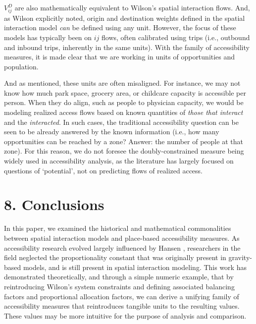\documentclass[
  10pt,
  letterpaper,
]{article}
\begin{document}
\(V_{ij}^D\) are also mathematically equivalent to Wilson's spatial
interaction flows. And, as Wilson \citep{wilson1971} explicitly noted,
origin and destination weights defined in the spatial interaction model
\emph{can} be defined using any unit. However, the focus of these models
has typically been on \(ij\) flows, often calibrated using trips (i.e.,
outbound and inbound trips, inherently in the same units). With the
family of accessibility measures, it is made clear that we are working
in units of opportunities and population.

And as mentioned, these units are often misaligned. For instance, we may
not know how much park space, grocery area, or childcare capacity is
accessible per person. When they do align, such as people to physician
capacity, we would be modeling realized access flows based on known
quantities of \emph{those that interact} and the \emph{interacted}. In
such cases, the traditional accessibility question can be seen to be
already answered by the known information (i.e., how many opportunities
can be reached by a zone? Answer: the number of people at that zone).
For this reason, we do not foresee the doubly-constrained measure being
widely used in accessibility analysis, as the literature has largely
focused on questions of `potential', not on predicting flows of realized
access.

\section{8. Conclusions}\label{conclusions}

In this paper, we examined the historical and mathematical commonalities
between spatial interaction models and place-based accessibility
measures. As accessibility research evolved largely influenced by Hansen
\citep{hansen1959}, researchers in the field neglected the
proportionality constant that was originally present in gravity-based
models, and is still present in spatial interaction modeling. This work
has demonstrated theoretically, and through a simple numeric example,
that by reintroducing Wilson's system constraints and defining
associated balancing factors and proportional allocation factors, we can
derive a unifying family of accessibility measures that reintroduces
tangible units to the resulting values. These values may be more
intuitive for the purpose of analysis and comparison.
\end{document}
